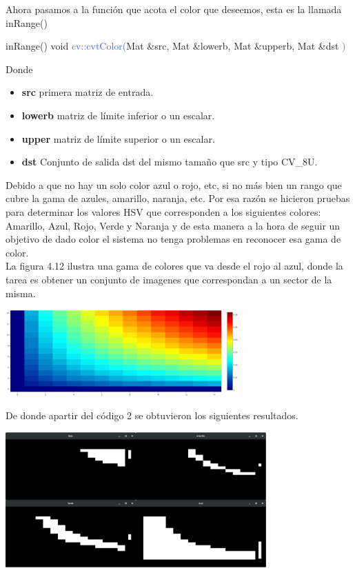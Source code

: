 Ahora pasamos a la función que acota el color que deseemos, esta es la llamada inRange()
\begin{example}[label={ex:serie}]{inRange()}
	\textcolor{Mulberry}{void} \textcolor{RoyalBlue}{cv::cvtColor(}\textcolor{BurntOrange}{Mat}
	\textcolor{Mulberry}{\&}\textcolor{Bittersweet}{src}, \textcolor{BurntOrange}{Mat} \textcolor{Mulberry}{\&}\textcolor{Bittersweet}{lowerb},
	\textcolor{BurntOrange}{Mat} \textcolor{Mulberry}{\&}\textcolor{Bittersweet}{upperb},
	\textcolor{BurntOrange}{Mat} \textcolor{Mulberry}{\&}\textcolor{Bittersweet}{dst}
	\textcolor{RoyalBlue}{)}
\end{example}
Donde
\begin{itemize}
	\item \textbf{src} primera matriz de entrada.
	\item \textbf{lowerb} matriz de límite inferior o un escalar.
	\item \textbf{upper}  matriz de límite superior o un escalar.
	\item \textbf{dst} Conjunto de salida dst del mismo tamaño que src y tipo CV\_8U.
\end{itemize}
Debido a que no hay un solo color azul o rojo, etc, si no más bien un rango que cubre
la gama de azules, amarillo, naranja, etc. Por esa razón se hicieron pruebas para
determinar los valores HSV que corresponden a los siguientes colores: Amarillo, Azul,
Rojo, Verde y Naranja y de esta manera a la hora de seguir un objetivo de dado color
el sistema no tenga problemas en reconocer esa gama de color.\\
La figura 4.12 ilustra una gama de colores que va desde el rojo al azul, donde la
tarea es obtener un conjunto de imagenes que correspondan a un sector de la misma.
\begin{center}
	\includegraphics[width=0.67\textwidth]{Contenido/Cuerpo/Capitulo4/Fig4.eps}
	\label{Fig6}
\end{center}
De donde apartir del código 2 se obtuvieron los siguientes resultados.
\begin{center}
	\includegraphics[width=0.75\textwidth]{Contenido/Cuerpo/Capitulo4/Fig5.eps}
	\label{Fig6}
\end{center}
